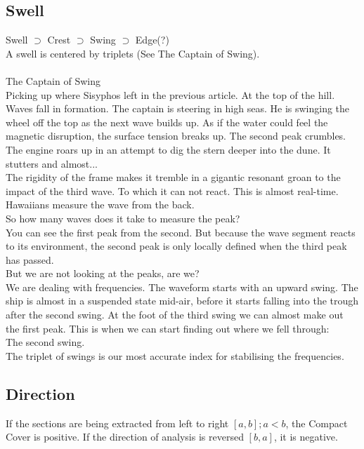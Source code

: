 \documentclass{report}
\begin{document}
\subsection{Swell}
Swell $\supset$ Crest $\supset$ Swing $\supset$ Edge(?)\\
A swell is centered by triplets (See The Captain of Swing).\\\\
The Captain of Swing\\
Picking up where Sisyphos left in the previous article. At the top of the hill. Waves fall in formation. The captain is steering in high seas. He is swinging the wheel off the top as the next wave builds up. As if the water could feel the magnetic disruption, the surface tension breaks up. The second peak crumbles. The engine roars up in an attempt to dig the stern deeper into the dune. It stutters and almost...\\
The rigidity of the frame makes it tremble in a gigantic resonant groan to the impact of the third wave. To which it can not react. This is almost real-time. Hawaiians measure the wave from the back.\\
So how many waves does it take to measure the peak?\\
You can see the first peak from the second. But because the wave segment reacts to its environment, the second peak is only locally defined when the third peak has passed.\\
But we are not looking at the peaks, are we?\\
We are dealing with frequencies. The waveform starts with an upward swing. The ship is almost in a suspended state mid-air, before it starts falling into the trough after the second swing. At the foot of the third swing we can almost make out the first peak. This is when we can start finding out where we fell through:\\
The second swing.\\
The triplet of swings is our most accurate index for stabilising the frequencies.

\subsection*{Direction}
If the sections are being extracted from left to right $[a,b];a<b$, the Compact Cover is positive. If the direction of analysis is reversed $[b,a]$, it is negative.

\iffalse
\printbibliography
\fi
{}

\end{document}
